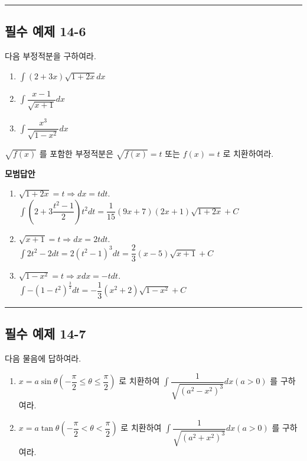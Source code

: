 \documentclass[a4paper,11pt]{article}
\begin{document}
\vspace{0.5cm}
\hrule
\vspace{0.5cm}

\subsection*{필수 예제 14-6}
다음 부정적분을 구하여라.
\begin{enumerate}[label=(\arabic*)]
    \item $\int(2+3x)\sqrt{1+2x}dx$
    \item $\int\dfrac{x-1}{\sqrt{x+1}}dx$
    \item $\int\dfrac{x^{3}}{\sqrt{1-x^{2}}}dx$
\end{enumerate}

\begin{studybox}
$\sqrt{f(x)}$ 를 포함한 부정적분은 $\sqrt{f(x)}=t$ 또는 $f(x)=t$ 로 치환하여라.
\end{studybox}

\textbf{모범답안}
\begin{enumerate}[label=(\arabic*)]
    \item $\sqrt{1+2x}=t \Rightarrow dx=tdt$.\\
     $\int (2+3\dfrac{t^2-1}{2})t^2 dt = \dfrac{1}{15}(9x+7)(2x+1)\sqrt{1+2x}+C$
    \item $\sqrt{x+1}=t \Rightarrow dx=2tdt$. \\
    $\int 2{t^2-2} dt = 2(t^2-1)^3dt = \dfrac{2}{3}(x-5)\sqrt{x+1}+C$
    \item $\sqrt{1-x^{2}}=t \Rightarrow xdx=-tdt$.\\
     $\int -(1-t^2)^\frac{3}{2} dt = -\dfrac{1}{3}(x^{2}+2)\sqrt{1-x^{2}}+C$
\end{enumerate}

\vspace{0.5cm}
\hrule
\vspace{0.5cm}

\subsection*{필수 예제 14-7}
다음 물음에 답하여라.
\begin{enumerate}[label=(\arabic*)]
    \item $x=a\sin\theta(-\dfrac{\pi}{2}\le\theta\le\dfrac{\pi}{2})$ 로 치환하여 $\int\dfrac{1}{\sqrt{(a^{2}-x^{2})^{3}}}dx(a>0)$ 를 구하여라.
    \item $x=a\tan\theta(-\dfrac{\pi}{2}<\theta<\dfrac{\pi}{2})$ 로 치환하여 $\int\dfrac{1}{\sqrt{(a^{2}+x^{2})^{3}}}dx(a>0)$ 를 구하여라.
\end{enumerate}
\end{document}
